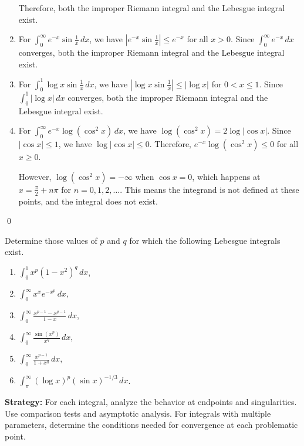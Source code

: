 \begin{enumerate}[label=(\alph*)]
Therefore, both the improper Riemann integral and the Lebesgue integral exist.

\item For $\int_{0}^{\infty} e^{-x} \sin \frac{1}{x} \, dx$, we have $|e^{-x} \sin \frac{1}{x}| \leq e^{-x}$ for all $x > 0$. Since $\int_{0}^{\infty} e^{-x} \, dx$ converges, both the improper Riemann integral and the Lebesgue integral exist.

\item For $\int_{0}^{1} \log x \sin \frac{1}{x} \, dx$, we have $|\log x \sin \frac{1}{x}| \leq |\log x|$ for $0 < x \leq 1$. Since $\int_{0}^{1} |\log x| \, dx$ converges, both the improper Riemann integral and the Lebesgue integral exist.

\item For $\int_{0}^{\infty} e^{-x} \log (\cos^2 x) \, dx$, we have $\log (\cos^2 x) = 2 \log |\cos x|$. Since $|\cos x| \leq 1$, we have $\log |\cos x| \leq 0$. Therefore, $e^{-x} \log (\cos^2 x) \leq 0$ for all $x \geq 0$.

However, $\log (\cos^2 x) = -\infty$ when $\cos x = 0$, which happens at $x = \frac{\pi}{2} + n\pi$ for $n = 0, 1, 2, \ldots$. This means the integrand is not defined at these points, and the integral does not exist.
\end{enumerate}\qed


\begin{problembox}
\begin{problemstatement}
Determine those values of $p$ and $q$ for which the following Lebesgue integrals exist.
\begin{enumerate}[label=(\alph*)]
\item $\int_{0}^{1} x^p (1 - x^2)^q \, dx$,
\item $\int_{0}^{\infty} x^x e^{-x^p} \, dx$,
\item $\int_{0}^{\infty} \frac{x^{p-1} - x^{q-1}}{1 - x} \, dx$,
\item $\int_{0}^{\infty} \frac{\sin(x^p)}{x^q} \, dx$,
\item $\int_{0}^{\infty} \frac{x^{p-1}}{1 + x^q} \, dx$,
\item $\int_{\pi}^{\infty} (\log x)^p (\sin x)^{-1/3} \, dx$.
\end{enumerate}
\end{problemstatement}
\end{problembox}

\noindent\textbf{Strategy:} For each integral, analyze the behavior at endpoints and singularities. Use comparison tests and asymptotic analysis. For integrals with multiple parameters, determine the conditions needed for convergence at each problematic point.

